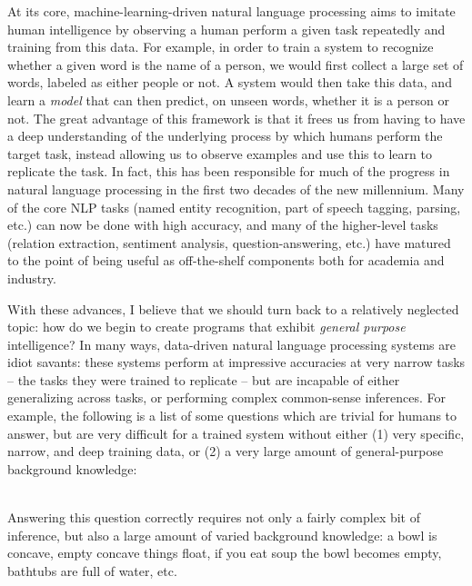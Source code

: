 
%
%
At its core, machine-learning-driven natural language processing aims to imitate human intelligence by
  observing a human perform a given task repeatedly and training from this data.
For example, in order to train a system to recognize whether a given word is the name of a person,
  we would first collect a large set of words, labeled as either people or not.
A system would then take this data, and learn a \textit{model} that can then predict, on unseen
  words, whether it is a person or not.
The great advantage of this framework is that it frees us from having to have a deep understanding of
  the underlying process by which humans perform the target task, instead allowing us to observe
  examples and use this to learn to replicate the task.
In fact, this has been responsible for much of the progress in natural language processing in
  the first two decades of the new millennium.
Many of the core NLP tasks (named entity recognition, part of speech tagging, parsing, etc.)
  can now be done with high accuracy,
  and many of the higher-level tasks (relation extraction, sentiment analysis, question-answering, etc.)
  have matured to the point of being useful as off-the-shelf components both for academia and industry.

With these advances, I believe that we should turn back to a relatively neglected
  topic: how do we begin to create programs that exhibit \textit{general purpose} intelligence?
In many ways, data-driven natural language processing systems are idiot savants:
  these systems perform at impressive accuracies at very narrow tasks -- the tasks they were trained
  to replicate -- but are incapable of either generalizing across tasks, or performing complex
  common-sense inferences.
For example, the following is a list of some questions which are trivial for humans to answer, 
  but are very difficult
  for a trained system without either (1) very specific, narrow, and deep training data, or (2) a very large
  amount of general-purpose background knowledge:

\begin{displayquote}
   \\
  Answering this question correctly requires not only a fairly complex bit of inference, but also
    a large amount of varied background knowledge: a bowl is concave, empty concave things float,
    if you eat soup the bowl becomes empty, bathtubs are full of water, etc.
\end{displayquote}

